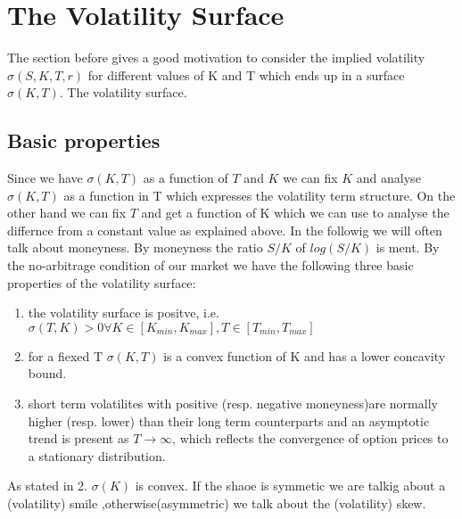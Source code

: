 \documentclass[12pt]{article}
\theoremstyle{definition}
\begin{document}
\section{The Volatility Surface}
The section before gives a good motivation to consider the implied volatility $\sigma(S,K,T,r)$ for different values of K and T which ends up in a surface$\sigma(K,T)$. The volatility surface.
\subsection{Basic properties}
Since we have $\sigma(K,T)$ as a function of $T$ and $K$ we can fix $K$ and analyse $\sigma(K,T)$ as a function in T which expresses the volatility term structure. On the other hand we can fix $T$ and get a function of K which we can use to analyse the differnce from a constant value as explained above. In the followig we will often talk about moneyness. By moneyness the ratio $S/K$ of $log(S/K)$ is ment.
By the no-arbitrage condition of our market we have the following three basic properties of the volatility surface:
\begin{enumerate}
\item the volatility surface is positve, i.e. $\sigma(T,K)>0 \forall K \in [K_{min},K_{max}],T \in [T_{min},T_{max}]$
\item for a fiexed T $\sigma(K,T)$ is a convex function of K and has a lower concavity bound.
\item short term volatilites with positive (resp. negative moneyness)are normally higher (resp. lower) than their long term counterparts and an asymptotic trend is present as $T \rightarrow \infty$, which reflects the convergence of option prices to a stationary distribution.
\end{enumerate}
As stated in 2. $\sigma(K)$ is convex. If the shaoe is symmetic we are talkig about a (volatility) smile ,otherwise(asymmetric) we talk about the (volatility) skew.

\end{document}
